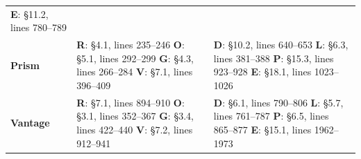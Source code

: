 \begin{longtable}{@{}P{.8in}P{2.45in}P{2.45in}@{}}
\textbf{E}: \S{}11.2, lines 780--789\\
\addlinespace[.65em]
\textbf{Prism} & \textbf{R}: \S{}4.1, lines 235--246 \newline
\textbf{O}: \S{}5.1, lines 292--299 \newline
\textbf{G}: \S{}4.3, lines 266--284 \newline
\textbf{V}: \S{}7.1, lines 396--409 &
\textbf{D}: \S{}10.2, lines 640--653 \newline
\textbf{L}: \S{}6.3, lines 381--388 \newline
\textbf{P}: \S{}15.3, lines 923--928 \newline
\textbf{E}: \S{}18.1, lines 1023--1026\\
\addlinespace[.65em]
\textbf{Vantage} & \textbf{R}: \S{}7.1, lines 894--910 \newline
\textbf{O}: \S{}3.1, lines 352--367 \newline
\textbf{G}: \S{}3.4, lines 422--440 \newline
\textbf{V}: \S{}7.2, lines 912--941 &
\textbf{D}: \S{}6.1, lines 790--806 \newline
\textbf{L}: \S{}5.7, lines 761--787 \newline
\textbf{P}: \S{}6.5, lines 865--877 \newline
\textbf{E}: \S{}15.1, lines 1962--1973\\
\end{longtable}
\endgroup
